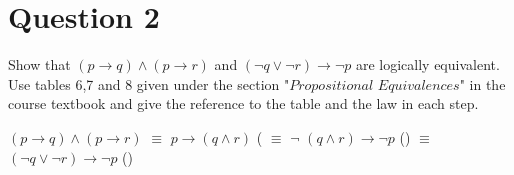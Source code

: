 \documentclass[a4paper,12pt]{article}
\newcommand\tab[1][1cm]{\hspace*{#1}}
\begin{document}
\section*{Question 2 \hfill {}}
\tab Show that $(p \rightarrow q) \wedge (p \rightarrow r)$ and $(\neg q \vee \neg r)\rightarrow \neg p$ are logically equivalent. Use tables 6,7 and 8 given under the section "$\textit{Propositional Equivalences}$" in the course textbook and give the reference to the table and the law in each step.

\begin{tcolorbox}
\text{}
$(p \rightarrow q) \wedge (p \rightarrow r)$ $\equiv$ $p \rightarrow (q \wedge r)$ \tab\tab (
\newline
\tab\tab\tab $\equiv$ $\neg$ $(q \wedge r) \rightarrow \neg p$ \tab ()
\newline
\tab\tab\tab $\equiv$  $(\neg q \vee \neg r) \rightarrow \neg p$ \tab ()
    
    

\end{tcolorbox}
\end{document}
